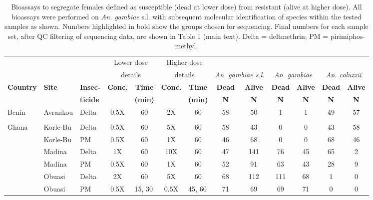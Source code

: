 \documentclass[a4paper,12pt]{article}
\begin{document}
\setlength{\tabcolsep}{0.5em}
\renewcommand{\arraystretch}{1.2}
\begin{table}[htbp]
	\caption{\footnotesize Bioassays to segregate females defined as susceptible (dead at lower dose) from resistant (alive at higher dose). All bioassays were performed on \textit{An. gambiae} s.l. with subsequent molecular identification of species within the tested samples as shown. Numbers highlighted in bold show the groups chosen for sequencing. Final numbers for each sample set, after QC filtering of sequencing data, are shown in Table 1 (main text). Delta = deltmethrin; PM = pirimiphos-methyl.}
	\tiny
\begin{tabular}{|l|l|l|c|c|c|c|c|c|c|c|c|c|}
\hline
        &  &  & \multicolumn{ 2}{c|}{Lower dose} & \multicolumn{ 2}{c|}{Higher dose} & \multicolumn{ 2}{c|}{} & \multicolumn{ 2}{c|}{} & \multicolumn{ 2}{c|}{} \\
        &  &  & \multicolumn{ 2}{c|}{details} & \multicolumn{ 2}{c|}{details} & \multicolumn{ 2}{c|}{\textit{An. gambiae s.l.}} & \multicolumn{ 2}{c|}{\textit{An. gambiae}} & \multicolumn{ 2}{c|}{\textit{An. coluzzii}} \\ \hline
		\textbf{Country} & \textbf{Site} & \textbf{Insec-} & \textbf{Conc.} & \textbf{Time}  & \textbf{Conc.} & \textbf{Time}  & \textbf{Dead} & \textbf{Alive} & \textbf{Dead} & \textbf{Alive} & \textbf{Dead} & \textbf{Alive} \\ 
		&      & \textbf{ticide} &       & \textbf{(min)} &       & \textbf{(min)} & \textbf{N}    & \textbf{N}     & \textbf{N}    & \textbf{N}     & \textbf{N}    & \textbf{N} \\ \hline
Benin & Avrankou & Delta & 0.5X & 60 & 2X & 60 & 58 & 50 & 1 & 1 & 49 & 57 \\ 
      &          &       &      &    &    &    &    &    &   &   &    &    \\ \hline
Ghana & Korle-Bu & Delta & 0.5X & 60 & 5X & 60 & 58 & 43 & 0 & 0 & 43 & 58 \\ 
 & Korle-Bu & PM & 0.5X & 60 & 1X & 60 & 46 & 68 & 0 & 0 & 68 & 46 \\ 
 & Madina & Delta & 1X & 60 & 10X & 60 & 47 & 141 & 76 & 45 & 65 & 2 \\ 
 & Madina & PM & 0.5X & 60 & 1X & 60 & 52 & 91 & 63 & 43 & 28 & 9 \\ 
 & Obuasi & Delta & 2X & 60 & 5X & 60 & 68 & 112 & 111 & 68 & 1 & 0 \\ 
 & Obuasi & PM & 0.5X & \multicolumn{1}{l|}{15, 30} & 0.5X & \multicolumn{1}{l|}{45, 60} & 71 & 69 & 69 & 71 & 0 & 0 \\ 

\end{tabular}
\end{table}
\end{document}
